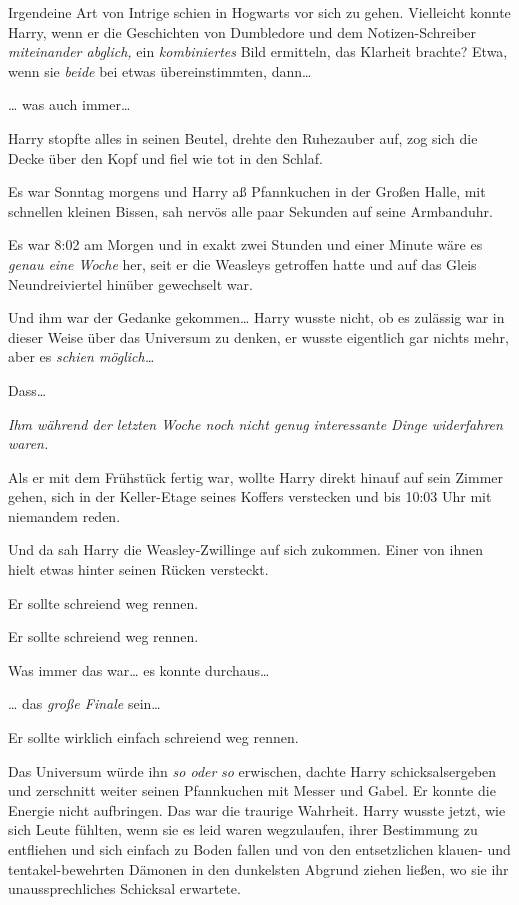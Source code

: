 {Irgendeine Art von Intrige schien in Hogwarts vor sich zu gehen. Vielleicht konnte Harry, wenn er die Geschichten von Dumbledore und dem Notizen-Schreiber \emph{miteinander abglich,} ein \emph{kombiniertes} Bild ermitteln, das Klarheit brachte? Etwa, wenn sie \emph{beide} bei etwas übereinstimmten, dann…

… was auch immer…

Harry stopfte alles in seinen Beutel, drehte den Ruhezauber auf, zog sich die Decke über den Kopf und fiel wie tot in den Schlaf.

\later

Es war Sonntag morgens und Harry aß Pfannkuchen in der Großen Halle, mit schnellen kleinen Bissen, sah nervös alle paar Sekunden auf seine Armbanduhr.

Es war 8:02 am Morgen und in exakt zwei Stunden und einer Minute wäre es \emph{genau eine Woche} her, seit er die Weasleys getroffen hatte und auf das Gleis Neundreiviertel hinüber gewechselt war.

Und ihm war der Gedanke gekommen… Harry wusste nicht, ob es zulässig war in dieser Weise über das Universum zu denken, er wusste eigentlich gar nichts mehr, aber es \emph{schien möglich…}

Dass…

\emph{Ihm während der letzten Woche noch nicht genug interessante Dinge widerfahren waren.}

Als er mit dem Frühstück fertig war, wollte Harry direkt hinauf auf sein Zimmer gehen, sich in der Keller-Etage seines Koffers verstecken und bis 10:03 Uhr mit niemandem reden.

Und da sah Harry die Weasley-Zwillinge auf sich zukommen. Einer von ihnen hielt etwas hinter seinen Rücken versteckt.

Er sollte schreiend weg rennen.

Er sollte schreiend weg rennen.

Was immer das war… es konnte durchaus…

… das \emph{große Finale} sein…

Er sollte wirklich einfach schreiend weg rennen.

Das Universum würde ihn \emph{so oder} \emph{so} erwischen, dachte Harry schicksalsergeben und zerschnitt weiter seinen Pfannkuchen mit Messer und Gabel. Er konnte die Energie nicht aufbringen. Das war die traurige Wahrheit. Harry wusste jetzt, wie sich Leute fühlten, wenn sie es leid waren wegzulaufen, ihrer Bestimmung zu entfliehen und sich einfach zu Boden fallen und von den entsetzlichen klauen- und tentakel-bewehrten Dämonen in den dunkelsten Abgrund ziehen ließen, wo sie ihr unaussprechliches Schicksal erwartete.

}
